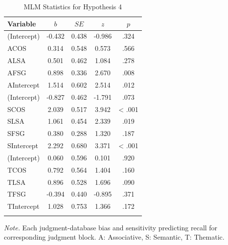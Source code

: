 \documentclass[english,,man]{apa6}
\begin{document}
\begin{table}[tbp]
\begin{center}
\begin{threeparttable}
\caption{\label{tab:hyp4-table}MLM Statistics for Hypothesis 4}
\begin{tabular}{lcccc}
\toprule
Variable & \multicolumn{1}{c}{$b$} & \multicolumn{1}{c}{$SE$} & \multicolumn{1}{c}{$z$} & \multicolumn{1}{c}{$p$}\\
\midrule
(Intercept) & -0.432 & 0.438 & -0.986 & .324\\
ACOS & 0.314 & 0.548 & 0.573 & .566\\
ALSA & 0.501 & 0.462 & 1.084 & .278\\
AFSG & 0.898 & 0.336 & 2.670 & .008\\
AIntercept & 1.514 & 0.602 & 2.514 & .012\\
(Intercept) & -0.827 & 0.462 & -1.791 & .073\\
SCOS & 2.039 & 0.517 & 3.942 & < .001\\
SLSA & 1.061 & 0.454 & 2.339 & .019\\
SFSG & 0.380 & 0.288 & 1.320 & .187\\
SIntercept & 2.292 & 0.680 & 3.371 & < .001\\
(Intercept) & 0.060 & 0.596 & 0.101 & .920\\
TCOS & 0.792 & 0.564 & 1.404 & .160\\
TLSA & 0.896 & 0.528 & 1.696 & .090\\
TFSG & -0.394 & 0.440 & -0.895 & .371\\
TIntercept & 1.028 & 0.753 & 1.366 & .172\\
\bottomrule
\addlinespace
\end{tabular}
\begin{tablenotes}[para]
\normalsize{\textit{Note.} Each judgment-database bias and sensitivity predicting recall for corresponding judgment block. A: Associative, S: Semantic, T: Thematic.}
\end{tablenotes}
\end{threeparttable}
\end{center}
\end{table}
\end{document}
